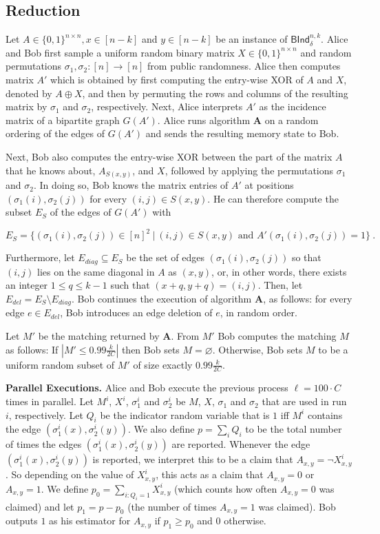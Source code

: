 \documentclass[10pt,a4paper]{article}
\begin{document}
\subsection{Reduction}
Let $A \in \{0, 1\}^{n \times n}, x \in [n-k]$ and  $y \in [n-k]$ be an instance of $\textsf{BInd}^{n,k}_{\delta}$. 
Alice and Bob first sample a uniform random binary matrix $X \in \{0,1\}^{n \times n}$ 
and random permutations $\sigma_1, \sigma_2: [n] \rightarrow [n]$ from public randomness. Alice then computes matrix 
$A'$ which is obtained by first computing the entry-wise XOR of $A$ and $X$, denoted by $A \oplus X$, 
and then by permuting the rows and columns
of the resulting matrix by $\sigma_1$ and $\sigma_2$, respectively. Next, Alice interprets $A'$ as the incidence matrix
of a bipartite graph $G(A')$. Alice runs algorithm $\mathbf{A}$ on a random ordering of the edges of $G(A')$ and sends
the resulting memory state to Bob.

Next, Bob also computes the entry-wise XOR between the part of the matrix $A$ that he knows about, $A_{S(x,y)}$, and $X$, followed by applying
the permutations $\sigma_1$ and $\sigma_2$. In doing so, Bob knows the matrix entries of $A'$ at positions 
$(\sigma_1(i), \sigma_2(j))$
for every $(i,j) \in S(x,y)$. He can therefore compute the subset $E_S$ of the edges of $G(A')$ with

$$E_S = \{(\sigma_1(i),\sigma_2(j)) \in [n]^2 \ | \ (i,j) \in S(x,y) \mbox{ and } A'(\sigma_1(i),\sigma_2(j)) = 1  \} \ .$$

Furthermore, let $E_{diag} \subseteq E_S$ be the set of edges $(\sigma_1(i), \sigma_2(j))$ so that $(i,j)$ lies on the same
diagonal in $A$ as $(x,y)$, or, in other words, there exists an integer $1 \le q \le k-1$ such that $(x+q, y+q) = (i, j)$.
Then, let $E_{del} = E_S \setminus E_{diag}$.
Bob continues the execution of algorithm $\mathbf{A}$, as follows: for every edge $e \in E_{del}$, 
Bob introduces an edge deletion of $e$, in random order.

%
%
%
Let $M'$ be the matching returned by $\mathbf{A}$.
From $M'$ Bob computes the matching $M$ as follows: If $|M' \le 0.99 \frac{k}{2C}|$ then Bob sets $M = \varnothing$.
%
%
Otherwise, Bob sets $M$ to be a uniform random subset of $M'$ of size exactly $0.99 \frac{k}{2C}$.

\textbf{Parallel Executions.} Alice and Bob execute the previous process $\ell = 100 \cdot C$ times in parallel. Let $M^i$, $X^i$, 
$\sigma_1^i$ and $\sigma_2^i$ be $M$, $X$, $\sigma_1$ and $\sigma_2$ that are used in run $i$, respectively.
%
Let $Q_i$ be the indicator random variable that is $1$ iff $M^i$ contains the edge $(\sigma^i_1(x), \sigma^i_2(y))$. 
We also define $p = \sum_i Q_i$ to be the total number of times the edges $(\sigma^i_1(x), \sigma^i_2(y))$ are reported. 
Whenever the edge $(\sigma^i_1(x), \sigma^i_2(y))$ is reported, we interpret this to be a claim that $A_{x,y} = \neg X^i_{x,y}$. So depending on the value of $X^i_{x,y}$, this acts as a claim that $A_{x,y} = 0$ or $A_{x,y} = 1$. We define $p_0 = \sum_{i: Q_i = 1} X^i_{x, y}$ (which counts how often
$A_{x,y} = 0$ was claimed) and let $p_1 = p - p_0$ (the number of times $A_{x,y} = 1$ was claimed). Bob outputs $1$ as his estimator for $A_{x,y}$ if $p_1 \ge p_0$ 
and $0$ otherwise.
\end{document}
